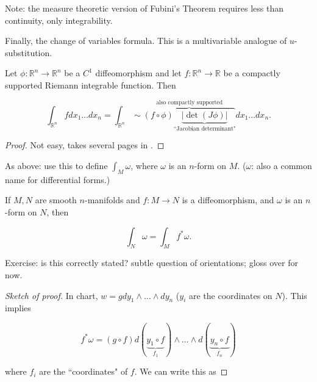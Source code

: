 Note: the measure theoretic version of Fubini's Theorem requires less than continuity, only integrability.

Finally, the change of variables formula. This is a multivariable analogue of \(u\)-substitution. 

\begin{theorem}

Let \(\phi: \mathbb{R}^n \to \mathbb{R}^n\) be a \(C^1\) diffeomorphism and let \(f: \mathbb{R}^n \to \mathbb{R}\) be a compactly supported Riemann integrable function. Then 

\[
\int_{\mathbb{R}^n} fdx_1 \ldots dx_n = \int_{\mathbb{R}^n} \sim \overbrace{(f \circ \phi) \underbrace{| \operatorname{det}(J \phi)|}_{\text{``Jacobian determinant"}}}^{\text{also compactly supported}} dx_1 \ldots dx_n.
\]

\end{theorem}

\begin{proof}

Not easy, takes several pages in \citet{pugh2015real}.

\end{proof}

As above: use this to define \(\int_M \omega\), where \(\omega\) is an \(n\)-form on \(M\). (\(\omega\): also a common name for differential forms.)

\begin{proposition}

If \(M, N\) are smooth \(n\)-manifolds and \(f: M \to N\) is a diffeomorphism, and \(\omega\) is an \(n\)-form on \(N\), then 

\[
\int_N \omega = \int_M f^* \omega.
\]

\end{proposition}

Exercise: is this correctly stated? subtle question of orientations; gloss over for now.

\begin{proof}[Sketch of proof]

In chart, \(w = gdy_1 \wedge \ldots \wedge dy_n\) (\(y_i\) are the coordinates on \(N\)). This implies 

\[
f^*\omega = (g \circ f)d(\underbrace{y_1 \circ f}_{f_1}) \wedge \ldots \wedge d(\underbrace{y_n \circ f}_{f_n})
\]

where \(f_i\) are the ``coordinates" of \(f\). We can write this as


\end{proof}

